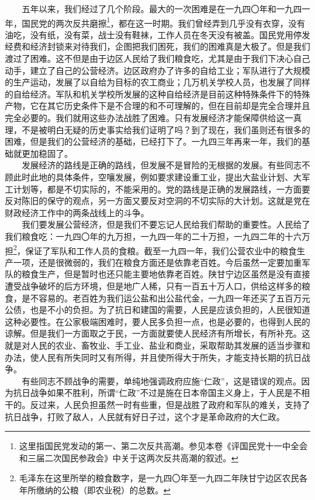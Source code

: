 \documentclass[cn,11pt,chinese]{elegantbook}
\begin{document}
　　五年以来，我们经过了几个阶段。最大的一次困难是在一九四〇年和一九四一年，国民党的两次反共磨擦\footnote[1]{ 这里指国民党发动的第一、第二次反共高潮。参见本卷《评国民党十一中全会和三届二次国民参政会》中关于这两次反共高潮的叙述。}，都在这一时期。我们曾经弄到几乎没有衣穿，没有油吃，没有纸，没有菜，战士没有鞋袜，工作人员在冬天没有被盖。国民党用停发经费和经济封锁来对待我们，企图把我们困死，我们的困难真是大极了。但是我们渡过了困难。这不但是由于边区人民给了我们粮食吃，尤其是由于我们下决心自己动手，建立了自己的公营经济。边区政府办了许多的自给工业；军队进行了大规模的生产运动，发展了以自给为目标的农工商业；几万机关学校人员，也发展了同样的自给经济。军队和机关学校所发展的这种自给经济是目前这种特殊条件下的特殊产物，它在其它历史条件下是不合理的和不可理解的，但在目前却是完全合理并且完全必要的。我们就用这些办法战胜了困难。只有发展经济才能保障供给这一真理，不是被明白无疑的历史事实给我们证明了吗？到了现在，我们虽则还有很多的困难，但是我们的公营经济的基础，已经打下了。一九四三年再来一年，我们的基础就更加稳固了。\\
　　发展经济的路线是正确的路线，但发展不是冒险的无根据的发展。有些同志不顾此时此地的具体条件，空嚷发展，例如要求建设重工业，提出大盐业计划、大军工计划等，都是不切实际的，不能采用的。党的路线是正确的发展路线，一方面要反对陈旧的保守的观点，另一方面又要反对空洞的不切实际的大计划。这就是党在财政经济工作中的两条战线上的斗争。\\
　　我们要发展公营经济，但是我们不要忘记人民给我们帮助的重要性。人民给了我们粮食吃：一九四〇年的九万担，一九四一年的二十万担，一九四二年的十六万担\footnote[2]{ 毛泽东在这里所举的粮食数字，是一九四〇年至一九四二年陕甘宁边区农民各年所缴纳的公粮（即农业税）的总数。}，保证了军队和工作人员的食粮。截至一九四一年，我们公营农业中的粮食生产一项，还是很微弱的，我们在粮食方面还是依靠老百姓。今后虽然一定要加重军队的粮食生产，但是暂时也还只能主要地依靠老百姓。陕甘宁边区虽然是没有直接遭受战争破坏的后方环境，但是地广人稀，只有一百五十万人口，供给这样多的粮食，是不容易的。老百姓为我们运公盐和出公盐代金，一九四一年还买了五百万元公债，也是不小的负担。为了抗日和建国的需要，人民是应该负担的，人民很知道这种必要性。在公家极端困难时，要人民多负担一点，也是必要的，也得到人民的谅解。但是我们一方面取之于民，一方面就要使人民经济有所增长，有所补充。这就是对人民的农业、畜牧业、手工业、盐业和商业，采取帮助其发展的适当步骤和办法，使人民有所失同时又有所得，并且使所得大于所失，才能支持长期的抗日战争。\\
　　有些同志不顾战争的需要，单纯地强调政府应施“仁政”，这是错误的观点。因为抗日战争如果不胜利，所谓“仁政”不过是施在日本帝国主义身上，于人民是不相干的。反过来，人民负担虽然一时有些重，但是战胜了政府和军队的难关，支持了抗日战争，打败了敌人，人民就有好日子过，这个才是革命政府的大仁政。\\
\end{document}
